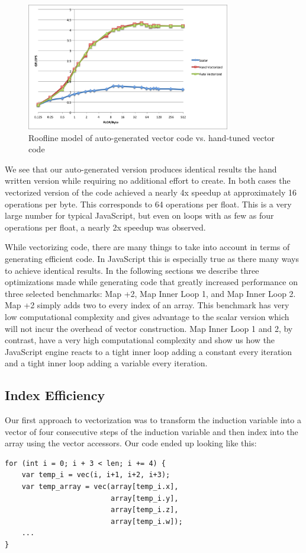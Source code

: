 \documentclass[conference]{IEEEtran}
\begin{document}
\begin{figure}[!t]
    \centering
    \includegraphics[width=3.5in]{roofline2}
    \caption{Roofline model of auto-generated vector code vs. hand-tuned vector code}
\end{figure}

We see that our auto-generated version produces identical results the hand
written version while requiring no additional effort to create. In both cases
the vectorized version of the code achieved a nearly 4x speedup at approximately
16 operations per byte. This corresponds to 64 operations per float. This is
a very large number for typical JavaScript, but even on loops with as few as
four operations per float, a nearly 2x speedup was observed.

While vectorizing code, there are many things to take into account in terms of
generating efficient code. In JavaScript this is especially true as there many
ways to achieve identical results. In the following sections we describe three
optimizations made while generating code that greatly increased performance on
three selected benchmarks: Map +2, Map Inner Loop 1, and Map Inner Loop 2. Map
+2 simply adds two to every index of an array. This benchmark has very low
computational complexity and gives advantage to the scalar version which will
not incur the overhead of vector construction. Map Inner Loop 1 and 2, by
contrast, have a very high computational complexity and show us how the
JavaScript engine reacts to a tight inner loop adding a constant every
iteration and a tight inner loop adding a variable every iteration.


\subsection{Index Efficiency}
Our first approach to vectorization was to transform the induction variable
into a vector of four consecutive steps of the induction variable and then
index into the array using the vector accessors. Our code ended up looking like
this:
\begin{verbatim}
for (int i = 0; i + 3 < len; i += 4) {
    var temp_i = vec(i, i+1, i+2, i+3);
    var temp_array = vec(array[temp_i.x],
                         array[temp_i.y],
                         array[temp_i.z],
                         array[temp_i.w]);
    ...
}
\end{verbatim}
\end{document}
